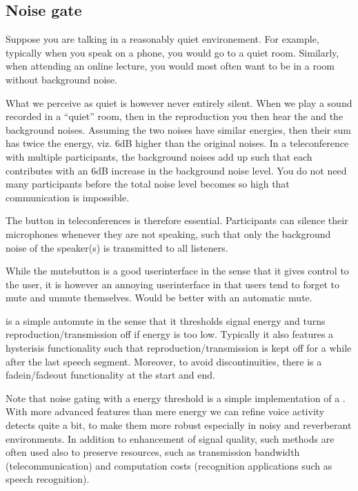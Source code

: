 \documentclass[letterpaper,10pt,english]{jupyterBook}
\begin{document}
\subsection{Noise gate}
\label{\detokenize{Enhancement/Noise_attenuation:noise-gate}}
\sphinxAtStartPar
Suppose you are talking in a reasonably quiet environement. For example, typically when you speak on a phone, you would go to a quiet room. Similarly, when attending an on\sphinxhyphen{}line lecture, you would most often want to be in a room without background noise.

\sphinxAtStartPar
What we perceive as quiet is however never entirely silent. When we play a sound recorded in a “quiet” room, then in the reproduction you then hear the  and the  background noises. Assuming the two noises have similar energies, then their sum has twice the energy, viz. 6dB higher than the original noises. In a teleconference with multiple participants, the background noises add up such that each contributes with an 6dB increase in the background noise level. You do not need many participants before the total noise level becomes so high that communication is impossible.

\sphinxAtStartPar
The \sphinxhyphen{}button in teleconferences is therefore essential. Participants can silence their microphones whenever they are not speaking, such that only the background noise of the  speaker(s) is transmitted to all listeners.

\sphinxAtStartPar
While the mute\sphinxhyphen{}button is a good user\sphinxhyphen{}interface in the sense that it gives control to the user, it is however an annoying user\sphinxhyphen{}interface in that users tend to forget to mute and unmute themselves. Would be better with an automatic mute.

\sphinxAtStartPar
{} is a simple auto\sphinxhyphen{}mute in the sense that it thresholds signal energy and turns reproduction/transmission off if energy is too low. Typically it also features a hysterisis functionality such that reproduction/transmission is kept off for a while after the last speech segment. Moreover, to avoid discontinuities, there is a fade\sphinxhyphen{}in/fade\sphinxhyphen{}out functionality at the start and end.

\sphinxAtStartPar
Note that noise gating with a energy threshold is a simple implementation of a . With more advanced features than mere energy we can refine voice activity detects quite a bit, to make them more robust especially in noisy and reverberant environments. In addition to enhancement of signal quality, such methods are often used also to preserve resources, such as transmission bandwidth (telecommunication) and computation costs (recognition applications such as speech recognition).
\end{document}
